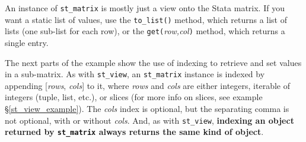 \documentclass{article}
\begin{document}
\medskip

An instance of \lstinline{st_matrix} is mostly just a view onto the Stata matrix. If you want a static list of values, use the \lstinline{to_list()} method, which returns a list of lists (one sub-list for each row), or the \lstinline{get(}\textit{row,col}\lstinline{)} method, which returns a single entry.
\smallskip

The next parts of the example show the use of indexing to retrieve and set values in a sub-matrix. As with \lstinline{st_view}, an \lstinline{st_matrix} instance is indexed by appending [\textit{rows}, \textit{cols}] to it, where \textit{rows} and \textit{cols} are either integers, iterable of integers (tuple, list, etc.), or slices (for more info on slices, see example \S\ref{st_view_example}). The \textit{cols} index is optional, but the separating comma is not optional, with or without \textit{cols}. And, as with \lstinline{st_view}, \textbf{indexing an object returned by \lstinline{st_matrix} always returns the same kind of object}.
\end{document}
